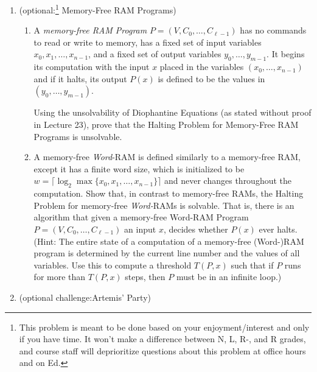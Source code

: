 \documentclass[11pt]{article}
\begin{document}
\begin{enumerate}
\begin{enumerate}
    {A Word-RAM program $P$}
    {$\yes$ if $P$ has an arithmetic overflow when run on input $\eps$, $\no$ otherwise}
  \end{enumerate}

    \item (optional:\footnote{This problem is meant to be done based on your enjoyment/interest and only if you have time. It won't make a difference between N, L, R-, and R grades, and course staff will deprioritize questions about this problem at office hours and on Ed.}  Memory-Free RAM Programs) 

\begin{enumerate}
\item A {\em memory-free
RAM Program} $P=(V,C_0,\ldots,C_{\ell-1})$ has no commands to read or write to memory, has a fixed set of input variables $x_0,x_1,\ldots,x_{n-1}$, and a fixed set of output variables $y_0,\ldots,y_{m-1}$.  It begins its computation with the
input $x$ placed in the variables $(x_0,\ldots,x_{n-1})$ and if it halts, its output $P(x)$ is defined to be the values in $(y_0,\ldots,y_{m-1})$.

Using the unsolvability of Diophantine Equations (as stated without proof in Lecture 23), prove that the Halting Problem for Memory-Free RAM Programs is unsolvable.

        \item
        A memory-free {\em Word}-RAM is defined similarly to a memory-free RAM, except it has a finite word size, which is initialized to be
        $w=\lceil \log_2 \max\{x_0,x_1,\ldots,x_{n-1}\}\rceil$ and never changes throughout the computation.
        Show that, in contrast to memory-free RAMs, the Halting Problem for memory-free {\em Word-}RAMs is solvable.  That is, there is an algorithm that
    given a memory-free Word-RAM Program $P=(V,C_0,\ldots,C_{\ell-1})$ an input $x$, decides whether $P(x)$ ever halts.
    (Hint: The entire state of a computation of a memory-free (Word-)RAM program is determined by the current line number and the values of all variables. Use this to compute a threshold $T(P,x)$ such that if $P$ runs for more than $T(P,x)$ steps, then $P$ must be in an infinite loop.)

 
    \end{enumerate}

    
    \item (optional challenge:\footnotemark[\value{footnote}] Artemis' Party) 


\end{enumerate}
\end{document}
